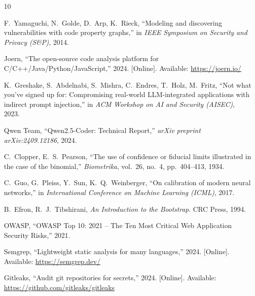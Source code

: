 \documentclass[12pt, a4paper]{article}
\begin{document}
\begin{thebibliography}{10}

F.~Yamaguchi, N.~Golde, D.~Arp, K.~Rieck,
``Modeling and discovering vulnerabilities with code property graphs,''
in \textit{IEEE Symposium on Security and Privacy (S\&P)}, 2014.

Joern,
``The open-source code analysis platform for C/C++/Java/Python/JavaScript,''
2024. [Online]. Available: \url{https://joern.io/}

K.~Greshake, S.~Abdelnabi, S.~Mishra, C.~Endres, T.~Holz, M.~Fritz,
``Not what you've signed up for: Compromising real-world LLM-integrated
applications with indirect prompt injection,''
in \textit{ACM Workshop on AI and Security (AISEC)}, 2023.

Qwen Team,
``Qwen2.5-Coder: Technical Report,''
\textit{arXiv preprint arXiv:2409.12186}, 2024.

C.~Clopper, E.~S.~Pearson,
``The use of confidence or fiducial limits illustrated in the case of
the binomial,''
\textit{Biometrika}, vol.~26, no.~4, pp.~404--413, 1934.

C.~Guo, G.~Pleiss, Y.~Sun, K.~Q.~Weinberger,
``On calibration of modern neural networks,''
in \textit{International Conference on Machine Learning (ICML)}, 2017.

B.~Efron, R.~J.~Tibshirani,
\textit{An Introduction to the Bootstrap}.
CRC Press, 1994.

OWASP,
``OWASP Top 10: 2021 -- The Ten Most Critical Web Application Security
Risks,'' 2021.

Semgrep,
``Lightweight static analysis for many languages,''
2024. [Online]. Available: \url{https://semgrep.dev/}

Gitleaks,
``Audit git repositories for secrets,''
2024. [Online]. Available: \url{https://github.com/gitleaks/gitleaks}

\end{thebibliography}
\end{document}
